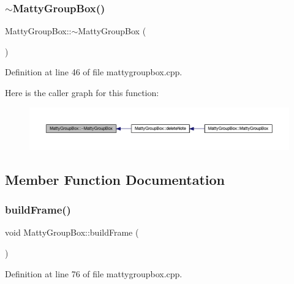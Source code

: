 \subsubsection{\texorpdfstring{$\sim$\+Matty\+Group\+Box()}{~MattyGroupBox()}}
{\footnotesize\ttfamily Matty\+Group\+Box\+::$\sim$\+Matty\+Group\+Box (\begin{DoxyParamCaption}{ }\end{DoxyParamCaption})}



Definition at line 46 of file mattygroupbox.\+cpp.

Here is the caller graph for this function\+:
\nopagebreak
\begin{figure}[H]
\begin{center}
\leavevmode
\includegraphics[width=350pt]{classMattyGroupBox_acf5f5023cf210a83e9846a35b149dd70_icgraph}
\end{center}
\end{figure}


\subsection{Member Function Documentation}
\hypertarget{classMattyGroupBox_ae9862aae672bd2cf4a99da541beef696}{}\label{classMattyGroupBox_ae9862aae672bd2cf4a99da541beef696} 
\subsubsection{\texorpdfstring{build\+Frame()}{buildFrame()}}
{\footnotesize\ttfamily void Matty\+Group\+Box\+::build\+Frame (\begin{DoxyParamCaption}{ }\end{DoxyParamCaption})\hspace{0.3cm}{\ttfamily [private]}}



Definition at line 76 of file mattygroupbox.\+cpp.

